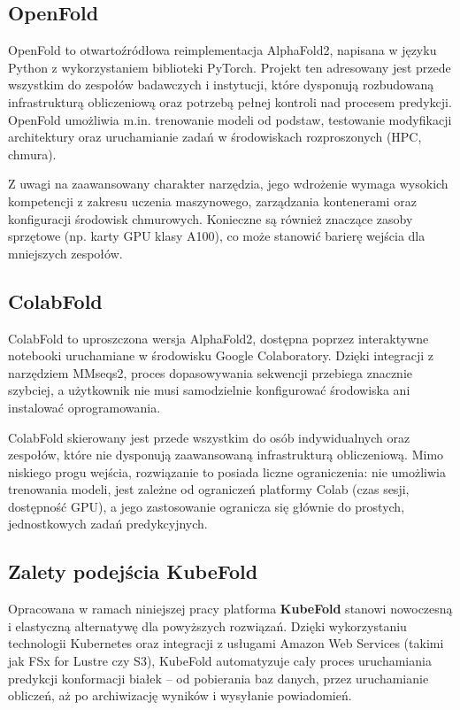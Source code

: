 \subsection*{OpenFold}

OpenFold to otwartoźródłowa reimplementacja AlphaFold2, napisana w języku Python z wykorzystaniem biblioteki PyTorch. Projekt ten adresowany jest przede wszystkim do zespołów badawczych i instytucji, które dysponują rozbudowaną infrastrukturą obliczeniową oraz potrzebą pełnej kontroli nad procesem predykcji. OpenFold umożliwia m.in. trenowanie modeli od podstaw, testowanie modyfikacji architektury oraz uruchamianie zadań w środowiskach rozproszonych (HPC, chmura).

Z uwagi na zaawansowany charakter narzędzia, jego wdrożenie wymaga wysokich kompetencji z zakresu uczenia maszynowego, zarządzania kontenerami oraz konfiguracji środowisk chmurowych. Konieczne są również znaczące zasoby sprzętowe (np. karty GPU klasy A100), co może stanowić barierę wejścia dla mniejszych zespołów.

\subsection*{ColabFold}

ColabFold to uproszczona wersja AlphaFold2, dostępna poprzez interaktywne notebooki uruchamiane w środowisku Google Colaboratory. Dzięki integracji z narzędziem MMseqs2, proces dopasowywania sekwencji przebiega znacznie szybciej, a użytkownik nie musi samodzielnie konfigurować środowiska ani instalować oprogramowania.

ColabFold skierowany jest przede wszystkim do osób indywidualnych oraz zespołów, które nie dysponują zaawansowaną infrastrukturą obliczeniową. Mimo niskiego progu wejścia, rozwiązanie to posiada liczne ograniczenia: nie umożliwia trenowania modeli, jest zależne od ograniczeń platformy Colab (czas sesji, dostępność GPU), a jego zastosowanie ogranicza się głównie do prostych, jednostkowych zadań predykcyjnych.

\subsection*{Zalety podejścia KubeFold}

Opracowana w ramach niniejszej pracy platforma \textbf{KubeFold} stanowi nowoczesną i elastyczną alternatywę dla powyższych rozwiązań. Dzięki wykorzystaniu technologii Kubernetes oraz integracji z usługami Amazon Web Services (takimi jak FSx for Lustre czy S3), KubeFold automatyzuje cały proces uruchamiania predykcji konformacji białek – od pobierania baz danych, przez uruchamianie obliczeń, aż po archiwizację wyników i wysyłanie powiadomień.

